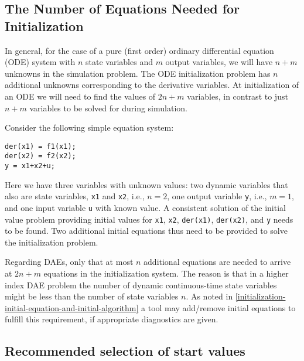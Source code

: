 \subsection{The Number of Equations Needed for Initialization}\label{the-number-of-equations-needed-for-initialization}

\begin{nonnormative}
In general, for the case of a pure (first order) ordinary
differential equation (ODE) system with $n$ state variables and $m$ output
variables, we will have $n+m$ unknowns in the simulation problem. The ODE
initialization problem has $n$ additional unknowns corresponding to the
derivative variables. At initialization of an ODE we will need to find
the values of $2n+m$ variables, in contrast to just $n+m$ variables to be
solved for during simulation.
\end{nonnormative}

\begin{example}
Consider the following simple equation system:
\begin{lstlisting}[language=modelica]
der(x1) = f1(x1);
der(x2) = f2(x2);
y = x1+x2+u;
\end{lstlisting}

Here we have three variables with unknown values: two dynamic
variables that also are state variables, \lstinline!x1! and \lstinline!x2!, i.e.,
$n=2$, one output variable \lstinline!y!, i.e., $m=1$, and one input variable \lstinline!u! with
known value. A consistent solution of the initial value problem
providing initial values for \lstinline!x1!, \lstinline!x2!, \lstinline!der(x1)!,
\lstinline!der(x2)!, and \lstinline!y! needs to be found. Two additional initial
equations thus need to be provided to solve the initialization problem.

Regarding DAEs, only that at most $n$ additional equations are
needed to arrive at $2n+m$ equations in the initialization system. The
reason is that in a higher index DAE problem the number of dynamic
continuous-time state variables might be less than the number of state
variables $n$. As noted in \cref{initialization-initial-equation-and-initial-algorithm} a tool may add/remove
initial equations to fulfill this requirement, if appropriate
diagnostics are given.
\end{example}

\subsection{Recommended selection of start values}\label{recommended-selection-of-start-values}

